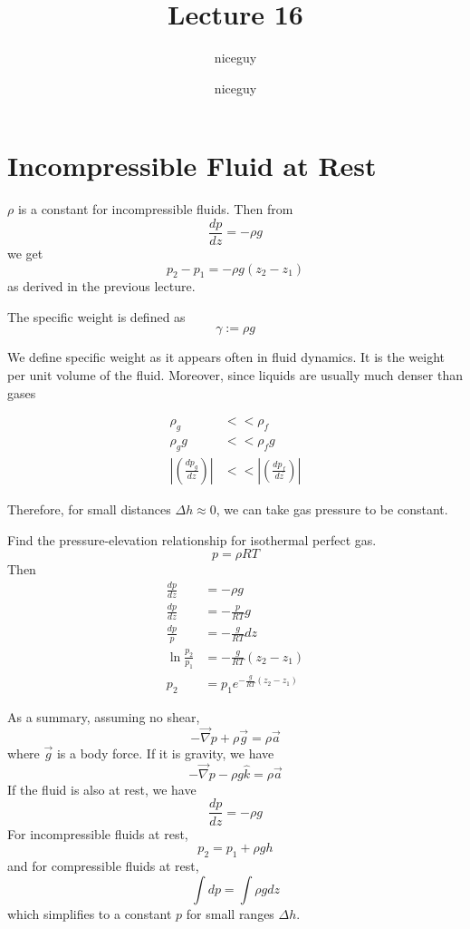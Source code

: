 \documentclass[12pt]{article}
\author{niceguy}
\title{Lecture 16}
\author{niceguy}
\begin{document}
\maketitle

\section{Incompressible Fluid at Rest}
$\rho$ is a constant for incompressible fluids. Then from
$$\frac{dp}{dz} = -\rho g$$
we get
$$p_2-p_1 = -\rho g(z_2-z_1)$$
as derived in the previous lecture. 

\begin{defn}
	The specific weight is defined as
	$$\gamma := \rho g$$
\end{defn}

We define specific weight as it appears often in fluid dynamics. It is the weight per unit volume of the fluid. Moreover, since liquids are usually much denser than gases

\begin{align*}
	\rho_g &<< \rho_f \\
	\rho_g g &<< \rho_f g \\
	\left|\left(\frac{dp_g}{dz}\right)\right| &<< \left|\left(\frac{dp_f}{dz}\right)\right|
\end{align*}

Therefore, for small distances $\Delta h \approx 0$, we can take gas pressure to be constant.

\begin{ex}
	Find the pressure-elevation relationship for isothermal perfect gas.
	$$p = \rho RT$$
	Then
	\begin{align*}
		\frac{dp}{dz} &= -\rho g \\
		\frac{dp}{dz} &= -\frac{p}{RT} g \\
		\frac{dp}{p} &= -\frac{g}{RT}dz \\
	\ln\frac{p_2}{p_1} &= -\frac{g}{RT}(z_2-z_1) \\
	p_2 &= p_1e^{-\frac{g}{RT}(z_2-z_1)}
\end{align*}
\end{ex}

As a summary, assuming no shear,
$$-\vec{\nabla}p + \rho\vec{g} = \rho\vec{a}$$
where $\vec{g}$ is a body force. If it is gravity, we have
$$-\vec{\nabla}p - \rho g\hat{k} = \rho\vec{a}$$
If the fluid is also at rest, we have
$$\frac{dp}{dz} = -\rho g$$
For incompressible fluids at rest,
$$p_2 = p_1+\rho gh$$
and for compressible fluids at rest,
$$\int dp = \int \rho gdz$$
which simplifies to a constant $p$ for small ranges $\Delta h$.
\end{document}
